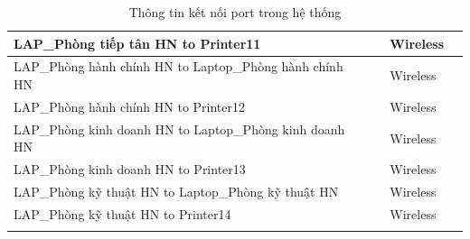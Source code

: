 \documentclass[12pt,a4paper]{report}
\begin{document}
\begin{center}
\begin{longtable}{|p{}|p{}|p{}|p{}|p{}|}
\hline  LAP\_Phòng tiếp tân HN  to  Printer11  &    &    &  Wireless  &   \\
\hline  LAP\_Phòng hành chính HN  to  Laptop\_Phòng hành chính HN  &    &    &  Wireless  &   \\
\hline  LAP\_Phòng hành chính HN  to  Printer12  &    &    &  Wireless  &   \\
\hline  LAP\_Phòng kinh doanh HN  to  Laptop\_Phòng kinh doanh HN  &    &    &  Wireless  &   \\
\hline  LAP\_Phòng kinh doanh HN  to  Printer13  &    &    &  Wireless  &   \\
\hline  LAP\_Phòng kỹ thuật HN  to  Laptop\_Phòng kỹ thuật HN  &    &    &  Wireless  &   \\
\hline  LAP\_Phòng kỹ thuật HN  to  Printer14  &    &    &  Wireless  &   \\
\hline


    \caption{Thông tin kết nối port trong hệ thống}
    \label{hinh31}
\end{longtable}

\end{center}
\end{document}

